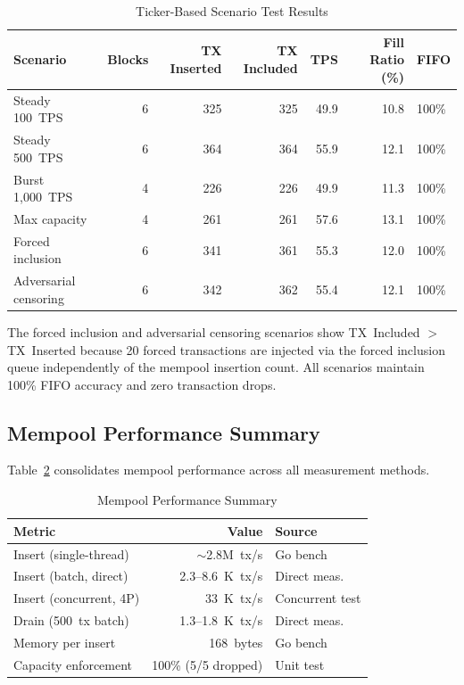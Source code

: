 \begin{table}[htbp]
\caption{Ticker-Based Scenario Test Results}
\label{tab:scenario-results}
\centering
\begin{tabular}{lrrrrrl}
\toprule
\textbf{Scenario} & \textbf{Blocks} & \textbf{TX Inserted} & \textbf{TX Included} & \textbf{TPS} & \textbf{Fill Ratio (\%)} & \textbf{FIFO} \\
\midrule
Steady 100~TPS & 6 & 325 & 325 & 49.9 & 10.8 & 100\% \\
Steady 500~TPS & 6 & 364 & 364 & 55.9 & 12.1 & 100\% \\
Burst 1{,}000~TPS & 4 & 226 & 226 & 49.9 & 11.3 & 100\% \\
Max capacity & 4 & 261 & 261 & 57.6 & 13.1 & 100\% \\
Forced inclusion & 6 & 341 & 361 & 55.3 & 12.0 & 100\% \\
Adversarial censoring & 6 & 342 & 362 & 55.4 & 12.1 & 100\% \\
\bottomrule
\end{tabular}
\end{table}

The forced inclusion and adversarial censoring scenarios show TX~Included $>$
TX~Inserted because 20 forced transactions are injected via the forced inclusion
queue independently of the mempool insertion count. All scenarios maintain 100\%
FIFO accuracy and zero transaction drops.

\subsection{Mempool Performance Summary}

Table~\ref{tab:mempool-summary} consolidates mempool performance across all
measurement methods.

\begin{table}[htbp]
\caption{Mempool Performance Summary}
\label{tab:mempool-summary}
\centering
\begin{tabular}{lrl}
\toprule
\textbf{Metric} & \textbf{Value} & \textbf{Source} \\
\midrule
Insert (single-thread) & ${\sim}$2.8M~tx/s & Go bench \\
Insert (batch, direct) & 2.3--8.6~K~tx/s & Direct meas. \\
Insert (concurrent, 4P) & 33~K~tx/s & Concurrent test \\
Drain (500~tx batch) & 1.3--1.8~K~tx/s & Direct meas. \\
Memory per insert & 168~bytes & Go bench \\
Capacity enforcement & 100\% (5/5 dropped) & Unit test \\
\bottomrule
\end{tabular}
\end{table}


